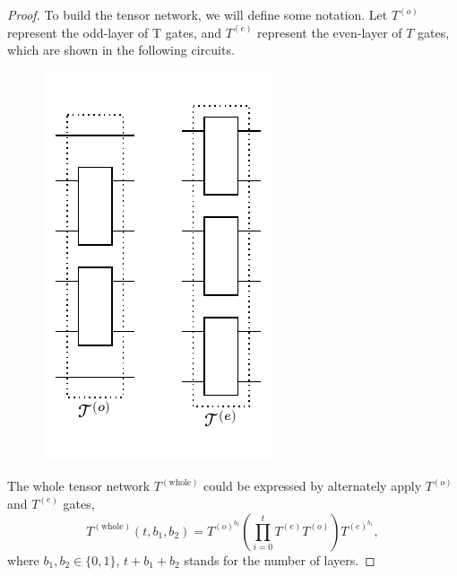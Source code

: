 \documentclass{article}
\newcommand{\Twhole}{T^{(\text{whole})}}
\begin{document}
\begin{proof}

To build the tensor network, we will define some notation. Let $T^{(o)}$ represent the odd-layer of T gates, and $T^{(e)}$ represent the even-layer of $T$ gates, which are shown in the following circuits.
\begin{figure}[H]
    \centering
    \includegraphics[width=0.22\linewidth]{figures/appendix/Todd_Teven.pdf}
\end{figure}
The whole tensor network $\Twhole$ could be expressed by alternately apply $T^{(o)}$ and $T^{(e)}$ gates, 
\begin{equation}
\Twhole \left(t, b_1, b_2\right)=T^{(o)^{b_2}}\left(\prod_{i=0}^{t} T^{(e)} T^{(o)}\right) T^{(e)^{b_1}}, 
\end{equation}
where $b_1, b_2 \in\{0,1\}$, $t+b_1+b_2$ stands for the number of layers.



\end{proof}
\end{document}
